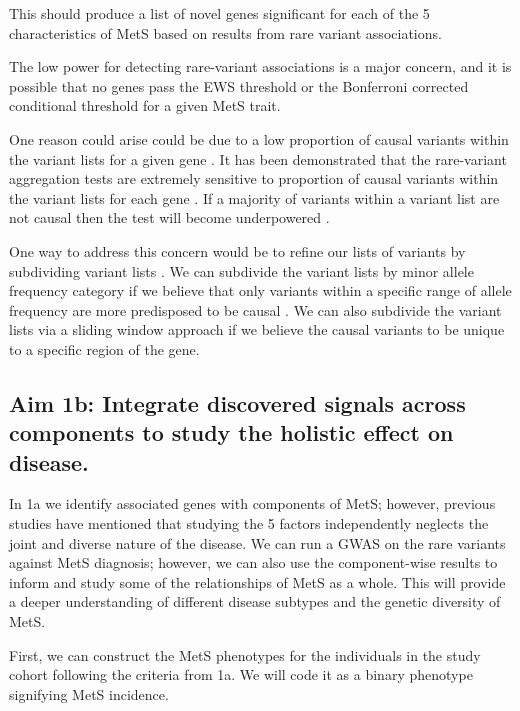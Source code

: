 \documentclass[11pt]{article}
\begin{document}
This should produce a list of novel genes significant for each of the 5 characteristics of MetS based on results from rare variant associations.

\noindent {} 

The low power for detecting rare-variant associations is a major concern, and it is possible that no genes pass the EWS threshold or the Bonferroni corrected conditional threshold for a given MetS trait.

One reason could arise could be due to a low proportion of causal variants within the variant lists for a given gene \cite{Zhou2022,pmid22863193}. It has been demonstrated that the rare-variant aggregation tests are extremely sensitive to proportion of causal variants within the variant lists for each gene \cite{Zhou2022,pmid22863193}. If a majority of variants within a variant list are not causal then the test will become underpowered \cite{Zhou2022,pmid22863193}. 

One way to address this concern would be to refine our lists of variants by subdividing variant lists \cite{Zhou2022}. We can subdivide the variant lists by minor allele frequency category if we believe that only variants within a specific range of allele frequency are more predisposed to be causal \cite{Zhou2022}. We can also subdivide the variant lists via a sliding window approach if we believe the causal variants to be unique to a specific region of the gene.

\subsection*{Aim 1b: Integrate discovered signals across components to study the holistic effect on disease.} 

\noindent {}

In 1a we identify associated genes with components of MetS; however, previous studies have mentioned that studying the 5 factors independently neglects the joint and diverse nature of the disease. We can run a GWAS on the rare variants against MetS diagnosis; however, we can also use the component-wise results to inform and study some of the relationships of MetS as a whole. This will provide a deeper understanding of different disease subtypes and the genetic diversity of MetS.

\noindent {}

First, we can construct the MetS phenotypes for the individuals in the study cohort following the criteria from 1a. We will code it as a binary phenotype signifying MetS incidence.
\end{document}
